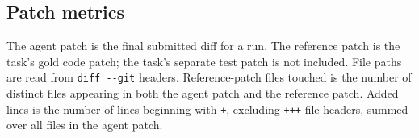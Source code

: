 \documentclass{article}
\begin{document}
\subsection{Patch metrics}
\label{app:patches}

The agent patch is the final submitted diff for a run. The reference patch is the task's gold code patch; the task's separate test patch is not included. File paths are read from \verb!diff --git! headers. Reference-patch files touched is the number of distinct files appearing in both the agent patch and the reference patch. Added lines is the number of lines beginning with \verb!+!, excluding \verb!+++! file headers, summed over all files in the agent patch.
\end{document}
